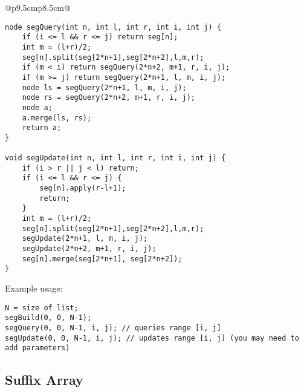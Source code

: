 \documentclass[letterpaper]{article}
\begin{document}
\begin{tabular}{@{}p{9.5cm}p{8.5cm}@{}}
\begin{lstlisting}
node segQuery(int n, int l, int r, int i, int j) {
	if (i <= l && r <= j) return seg[n];
	int m = (l+r)/2;
	seg[n].split(seg[2*n+1],seg[2*n+2],l,m,r);
	if (m < i) return segQuery(2*n+2, m+1, r, i, j);
	if (m >= j) return segQuery(2*n+1, l, m, i, j);
	node ls = segQuery(2*n+1, l, m, i, j);
	node rs = segQuery(2*n+2, m+1, r, i, j);
	node a;
	a.merge(ls, rs);
	return a;
}

void segUpdate(int n, int l, int r, int i, int j) {
	if (i > r || j < l) return;
	if (i <= l && r <= j) {
		seg[n].apply(r-l+1);
		return;
	}
	int m = (l+r)/2;
	seg[n].split(seg[2*n+1],seg[2*n+2],l,m,r);
	segUpdate(2*n+1, l, m, i, j);
	segUpdate(2*n+2, m+1, r, i, j);
	seg[n].merge(seg[2*n+1], seg[2*n+2]);
}
\end{lstlisting}
\end{tabular}

Example usage:
\begin{lstlisting}
N = size of list;
segBuild(0, 0, N-1);
segQuery(0, 0, N-1, i, j); // queries range [i, j]
segUpdate(0, 0, N-1, i, j); // updates range [i, j] (you may need to add parameters)
\end{lstlisting}

\clearpage

\subsection{Suffix Array}
\end{document}
